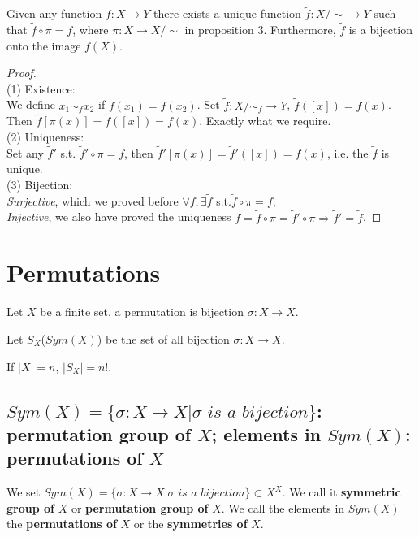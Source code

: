 \documentclass[11pt]{elegantbook}
\begin{document}
\begin{proposition}[Proposition 1.2.13]
    Given any function $f:X \rightarrow Y$ there exists a unique function $\tilde{f}:X/\sim \rightarrow Y$ such that $\tilde{f}\circ \pi=f$, where $\pi: X \rightarrow X/\sim$ in proposition 3. Furthermore, $\tilde{f}$ is a bijection onto the image $f(X)$.
\end{proposition}
\begin{proof}
\quad\\
(1) Existence:\\
We define $x_1\sim_f x_2$ if $f(x_1)=f(x_2)$. Set $\tilde{f}:X/\sim_f \rightarrow Y$, $\tilde{f}([x])=f(x)$. Then $\tilde{f}[\pi(x)]=\tilde{f}([x])=f(x)$. Exactly what we require.\\
(2) Uniqueness:\\
Set any $\tilde{f}'$ s.t. $\tilde{f}'\circ\pi=f$, then $\tilde{f}'[\pi(x)]=\tilde{f}'([x])=f(x)$, i.e. the $\tilde{f}$ is unique.\\
(3) Bijection:\\
\textit{Surjective}, which we proved before $\forall f, \exists \tilde{f}$ s.t.$\tilde{f}\circ\pi=f$;\\
\textit{Injective}, we also have proved the uniqueness $f=\tilde{f}\circ\pi=\tilde{f}'\circ\pi\Rightarrow\tilde{f}'=\tilde{f}$.
\end{proof}





\chapter{Permutations}
\begin{definition}
    Let $X$ be a finite set, a permutation is bijection $\sigma:X \rightarrow X$.
\end{definition}
\begin{definition}
    Let $S_X$($Sym(X)$) be the set of all bijection $\sigma:X \rightarrow X$.
\end{definition}
If $|X|=n$, $|S_X|=n!$.

\section{$Sym(X)=\{\sigma: X\rightarrow X| \sigma \textit{ is a bijection} \}$: \textbf{permutation group of} $X$; elements in $Sym(X)$: \textbf{permutations of} $X$}
We set $Sym(X)=\{\sigma: X\rightarrow X| \sigma \textit{ is a bijection} \}\subset X^X$. We call it \textbf{symmetric group of} $X$ or \textbf{permutation group of} $X$. We call the elements in $Sym(X)$ the \textbf{permutations of} $X$ or the \textbf{symmetries of} $X$.
\end{document}
